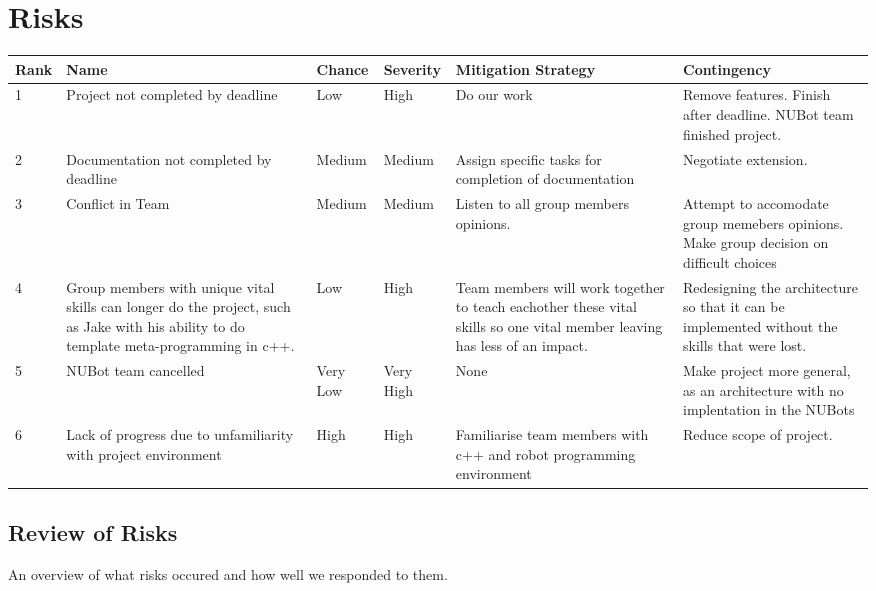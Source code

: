 \documentclass[a4paper]{article}
\begin{document}
	\section{Risks}
		\begin{table}[htbp]
		\begin{tabularx}{\linewidth}{ | m{0.6cm} |  X | m{1.05cm} |  m{1.05cm} |  X | X |}
			\hline 
			Rank & Name & Chance & Severity & Mitigation Strategy & Contingency \\  \hline
			1 & Project not completed by deadline & Low & High & Do our work & Remove features. Finish after deadline. NUBot team finished project. \\ \hline
			2 & Documentation not completed by deadline & Medium & Medium & Assign specific tasks for completion of documentation & Negotiate extension. \\ \hline
			3 & Conflict in Team & Medium & Medium & Listen to all group members opinions. & Attempt to accomodate group memebers opinions. Make group decision on difficult choices \\ \hline
			4 & Group members with unique vital skills can longer do the project, such as Jake with his ability to do template meta-programming in c++. & Low & High & Team members will work together to teach eachother these vital skills so one vital member leaving has less of an impact. & Redesigning the architecture so that it can be implemented without the skills that were lost. \\ \hline
			5 & NUBot team cancelled & Very Low & Very High & None & Make project more general, as an architecture with no implentation in the NUBots \\ \hline
			6 & Lack of progress due to unfamiliarity with project environment & High & High & Familiarise team members with c++ and robot programming environment & Reduce scope of project. \\ \hline
		\end{tabularx}
		\end{table}
		\subsection{Review of Risks}
			An overview of what risks occured and how well we responded to them.
\end{document}
